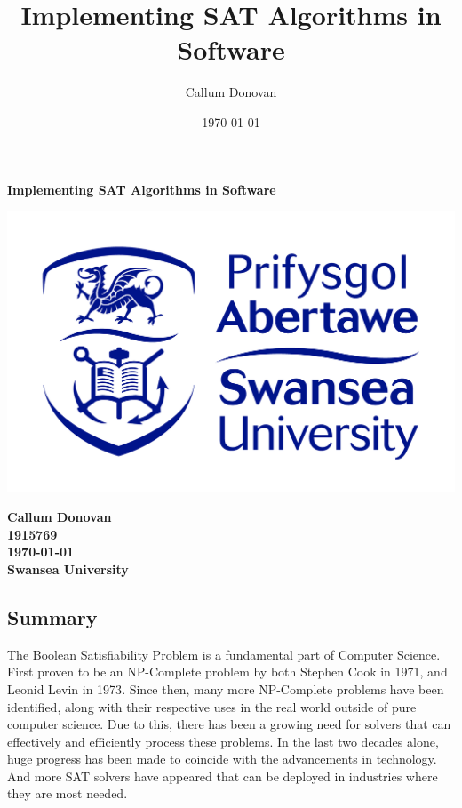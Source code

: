 \documentclass{article}
\title{\bfseries Implementing SAT Algorithms in Software}
\author{Callum Donovan}
\date{ \today }
\begin{document}
\begin{titlepage}
    \begin{center}
        \Large{\bfseries Implementing SAT Algorithms in Software} \\
        \vspace*{\fill}
        \begin{center}
            \includegraphics[scale=0.15]{swan.jpg}
        \end{center}
        \vspace*{\fill}
        \bfseries{\large Callum Donovan \\
            1915769 \\
            \today \\
            Swansea University \\}
    \end{center}
\end{titlepage}

\thispagestyle{empty}
\begin{center}
    \section*{Summary}
\end{center}
The Boolean Satisfiability Problem is a fundamental part of Computer Science. First proven to be an
NP-Complete problem by both Stephen Cook in 1971\cite{scook}, and Leonid Levin in 1973\cite{levin}. Since then, many more
NP-Complete problems have been identified, along with their respective uses in the real world
outside of pure computer science. Due to this, there has been a growing need for solvers that can
effectively and efficiently process these problems. In the last two decades alone, huge progress has
been made to coincide with the advancements in technology. And more SAT solvers have appeared that
can be deployed in industries where they are most needed.
\end{document}
